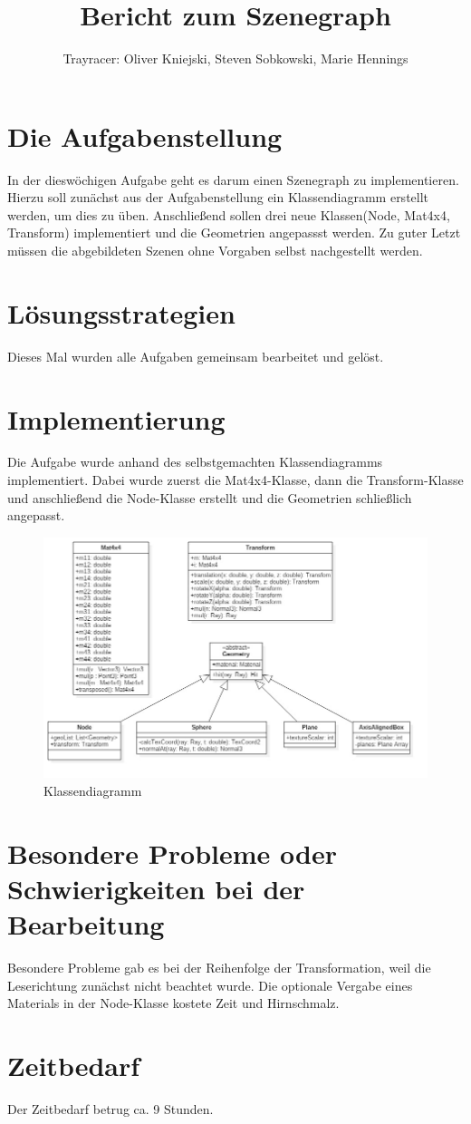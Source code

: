 \documentclass[a4paper,parskip=half,11pt]{scrartcl}
\author{Trayracer: Oliver Kniejski, Steven Sobkowski, Marie Hennings}
\title{Bericht zum Szenegraph}
\begin{document}
 
\maketitle

\section*{Die Aufgabenstellung}
In der dieswöchigen Aufgabe geht es darum einen Szenegraph zu implementieren. Hierzu soll zunächst aus der Aufgabenstellung ein Klassendiagramm erstellt werden, um dies zu üben. Anschließend sollen drei neue Klassen(Node, Mat4x4, Transform) implementiert und die Geometrien angepassst werden. Zu guter Letzt müssen die abgebildeten Szenen ohne Vorgaben selbst nachgestellt werden.

\section*{Lösungsstrategien}
Dieses Mal wurden alle Aufgaben gemeinsam bearbeitet und gelöst.


\section*{Implementierung}
Die Aufgabe wurde anhand des selbstgemachten Klassendiagramms implementiert. Dabei wurde zuerst die Mat4x4-Klasse, dann die Transform-Klasse und anschließend die Node-Klasse erstellt und die Geometrien schließlich angepasst. 

\begin{figure}
\centering
\includegraphics[width=\linewidth]{cg5}
\caption{Klassendiagramm}
\end{figure}


\section*{Besondere Probleme oder Schwierigkeiten bei der Bearbeitung}
Besondere Probleme gab es bei der Reihenfolge der Transformation, weil die Leserichtung zunächst nicht beachtet wurde. Die optionale Vergabe eines Materials in der Node-Klasse kostete Zeit und Hirnschmalz.

\section*{Zeitbedarf}
Der Zeitbedarf betrug ca. 9 Stunden.
\end{document}
